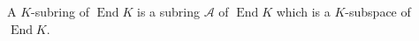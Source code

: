 A $K$-subring of $\operatorname{End} K$ is a subring $\mathcal{A}$ of $\operatorname{End} K$ which is a $K$-subspace of $\operatorname{End} K$.
